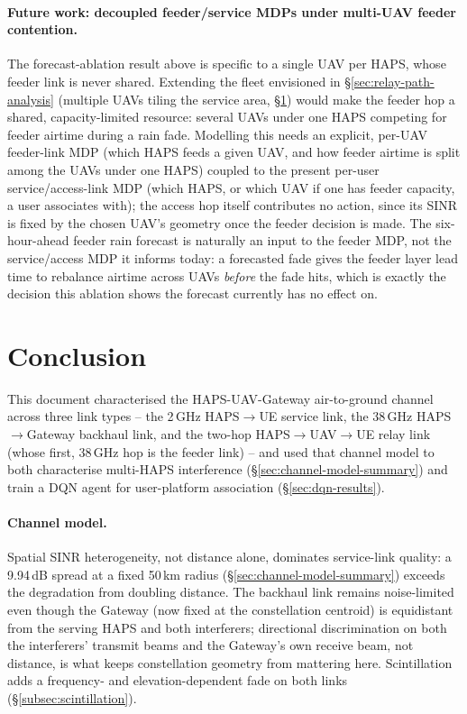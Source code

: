 \documentclass[conference]{IEEEtran}
\begin{document}
\paragraph{Future work: decoupled feeder/service MDPs under multi-UAV feeder contention.} The forecast-ablation result above is specific to a single UAV per HAPS, whose feeder link is never shared. Extending the fleet envisioned in \S\ref{sec:relay-path-analysis} (multiple UAVs tiling the service area, \S\ref{sec:conclusion}) would make the feeder hop a shared, capacity-limited resource: several UAVs under one HAPS competing for feeder airtime during a rain fade. Modelling this needs an explicit, per-UAV feeder-link MDP (which HAPS feeds a given UAV, and how feeder airtime is split among the UAVs under one HAPS) coupled to the present per-user service/access-link MDP (which HAPS, or which UAV if one has feeder capacity, a user associates with); the access hop itself contributes no action, since its SINR is fixed by the chosen UAV's geometry once the feeder decision is made. The six-hour-ahead feeder rain forecast is naturally an input to the feeder MDP, not the service/access MDP it informs today: a forecasted fade gives the feeder layer lead time to rebalance airtime across UAVs \emph{before} the fade hits, which is exactly the decision this ablation shows the forecast currently has no effect on.

\section{Conclusion}
\label{sec:conclusion}

This document characterised the HAPS-UAV-Gateway air-to-ground channel
across three link types -- the 2\,GHz HAPS$\rightarrow$UE service link,
the 38\,GHz HAPS$\rightarrow$Gateway backhaul link, and the two-hop
HAPS$\rightarrow$UAV$\rightarrow$UE relay link (whose first, 38\,GHz hop is
the feeder link) -- and used that channel
model to both characterise multi-HAPS interference (\S\ref{sec:channel-model-summary})
and train a DQN agent for user-platform association (\S\ref{sec:dqn-results}).

\paragraph{Channel model.} Spatial SINR heterogeneity, not distance alone,
dominates service-link quality: a 9.94\,dB spread at a fixed 50\,km radius
(\S\ref{sec:channel-model-summary}) exceeds the degradation from doubling distance.
The backhaul link remains noise-limited even though the Gateway (now fixed at the
constellation centroid) is equidistant from the serving HAPS and both interferers;
directional discrimination on both the interferers' transmit beams and the Gateway's own
receive beam, not distance, is what keeps constellation geometry from mattering here.
Scintillation adds a frequency- and elevation-dependent
fade on both links (\S\ref{subsec:scintillation}).
\end{document}
